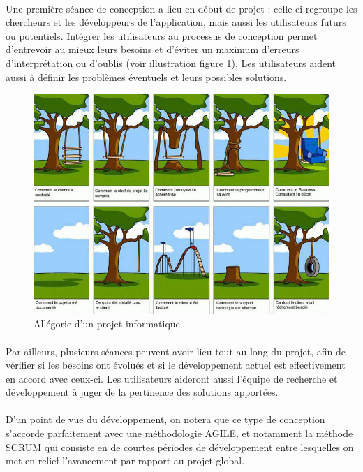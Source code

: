 \paragraph{}
Une première séance de conception a lieu en début de projet : celle-ci regroupe les chercheurs et les développeurs de l'application, mais aussi les utilisateurs futurs ou potentiels. Intégrer les utilisateurs au processus de conception permet d'entrevoir au mieux leurs besoins et d'éviter un maximum d'erreurs d'interprétation ou d'oublis (voir illustration figure \ref{projet_info}). Les utilisateurs aident aussi à définir les problèmes éventuels et leurs possibles solutions.
\begin{figure}
	\centering
	\includegraphics[width=16cm]{images/projet_info.jpg}
	\caption{Allégorie d'un projet informatique}
	\label{projet_info}
\end{figure}

\paragraph{}Par ailleurs, plusieurs séances peuvent avoir lieu tout au long du projet, afin de vérifier si les besoins ont évolués et si le développement actuel est effectivement en accord avec ceux-ci. Les utilisateurs aideront aussi l'équipe de recherche et développement à juger de la pertinence des solutions apportées.
\paragraph{}
D'un point de vue du développement, on notera que ce type de conception s'accorde parfaitement avec une méthodologie AGILE, et notamment la méthode SCRUM qui consiste en de courtes périodes de développement entre lesquelles on met en relief l'avancement par rapport au projet global.
